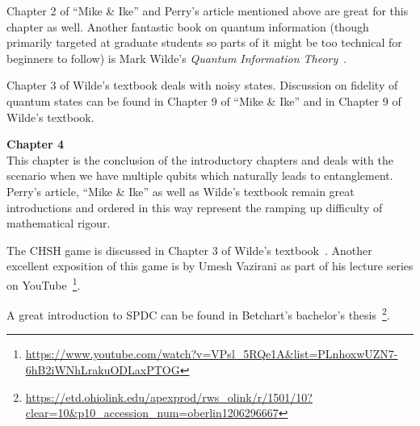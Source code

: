 Chapter 2 of “Mike \& Ike” and Perry’s article mentioned above are great for this chapter as well. Another fantastic book on quantum information (though primarily targeted at graduate students so parts of it might be too technical for beginners to follow) is Mark Wilde's \emph{Quantum Information Theory}~\cite{wilde2013quantum}.

Chapter 3 of Wilde’s textbook deals with noisy states. Discussion on fidelity of quantum states can be found in Chapter 9 of “Mike \& Ike” and in Chapter 9 of Wilde’s textbook.\\

\newpage

\textbf{Chapter 4}\\

This chapter is the conclusion of the introductory chapters and deals with the scenario when we have multiple qubits which naturally leads to entanglement. Perry’s article, “Mike \& Ike” as well as Wilde’s textbook remain great introductions and ordered in this way represent the ramping up difficulty of mathematical rigour. 

The CHSH game is discussed in Chapter 3 of Wilde’s textbook~\cite{wilde2013quantum}. Another excellent exposition of this game is by Umesh Vazirani as part of his lecture series on YouTube~\footnote{\url{https://www.youtube.com/watch?v=VPsl_5RQe1A&list=PLnhoxwUZN7-6hB2iWNhLrakuODLaxPTOG}}.

A great introduction to SPDC can be found in Betchart’s bachelor's thesis~\footnote{\url{https://etd.ohiolink.edu/apexprod/rws_olink/r/1501/10?clear=10&p10_accession_num=oberlin1206296667}}.

